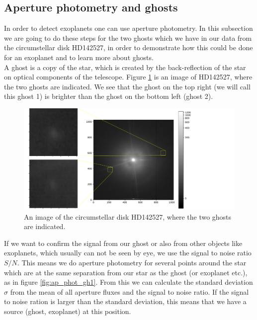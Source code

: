 \subsection{Aperture photometry and ghosts}
In order to detect exoplanets one can use aperture photometry. In this subsection we are going to do these steps for the two ghosts which we have in our data from the circumstellar disk HD142527, in order to demonstrate how this could be done for an exoplanet and to learn more about ghosts.\\
A ghost is a copy of the star, which is created by the back-reflection of the star on optical components of the telescope. Figure \ref{fig:ghosts} is an image of HD142527, where the two ghosts are indicated. We see that the ghost on the top right (we will call this ghost 1) is brighter than the ghost on the bottom left (ghost 2). 
\begin{figure}[H]
	\centering
		\includegraphics[width=1.3\textwidth]{pics/Ghosts.pdf}
		\caption{An image of the circumstellar disk HD142527, where the two ghosts are indicated.}
		\label{fig:ghosts}
\end{figure}
If we want to confirm the signal from our ghost or also from other objects like exoplanets, which usually can not be seen by eye, we use the signal to noise ratio $S/N$. This means we do aperture photometry for several points around the star which are at the same separation from our star as the ghost (or exoplanet etc.), as in figure \ref{fig:ap_phot_gh1}. From this we can calculate the standard deviation $\sigma$ from the mean of all aperture fluxes and the signal to noise ratio. If the signal to noise ration is larger than the standard deviation, this means that we have a source (ghost, exoplanet) at this position. 
